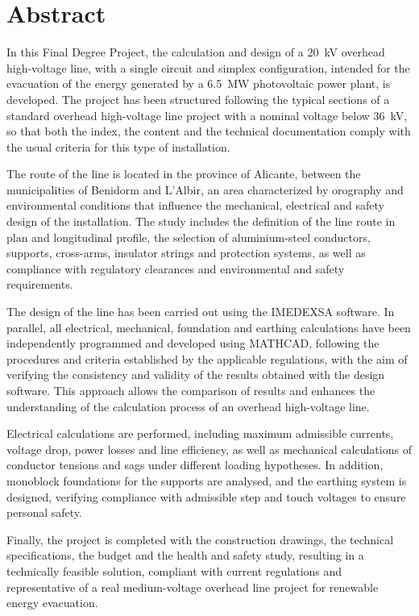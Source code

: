 \chapter*{Abstract}
In this Final Degree Project, the calculation and design of a \SI{20}{\kilo\volt} overhead high-voltage line, with a single circuit and simplex configuration, intended for the evacuation of the energy generated by a \SI{6.5}{\mega\watt} photovoltaic power plant, is developed. The project has been structured following the typical sections of a standard overhead high-voltage line project with a nominal voltage below \SI{36}{\kilo\volt}, so that both the index, the content and the technical documentation comply with the usual criteria for this type of installation.

The route of the line is located in the province of Alicante, between the municipalities of Benidorm and L’Albir, an area characterized by orography and environmental conditions that influence the mechanical, electrical and safety design of the installation. The study includes the definition of the line route in plan and longitudinal profile, the selection of aluminium-steel conductors, supports, cross-arms, insulator strings and protection systems, as well as compliance with regulatory clearances and environmental and safety requirements.

The design of the line has been carried out using the IMEDEXSA software. In parallel, all electrical, mechanical, foundation and earthing calculations have been independently programmed and developed using MATHCAD, following the procedures and criteria established by the applicable regulations, with the aim of verifying the consistency and validity of the results obtained with the design software. This approach allows the comparison of results and enhances the understanding of the calculation process of an overhead high-voltage line.

Electrical calculations are performed, including maximum admissible currents, voltage drop, power losses and line efficiency, as well as mechanical calculations of conductor tensions and sags under different loading hypotheses. In addition, monoblock foundations for the supports are analysed, and the earthing system is designed, verifying compliance with admissible step and touch voltages to ensure personal safety.

Finally, the project is completed with the construction drawings, the technical specifications, the budget and the health and safety study, resulting in a technically feasible solution, compliant with current regulations and representative of a real medium-voltage overhead line project for renewable energy evacuation.
